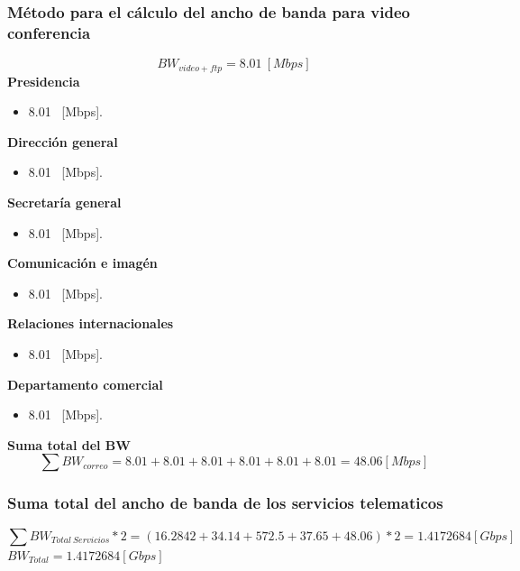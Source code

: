 \documentclass[12pt,letterpaper]{article}
\begin{document}
\subsubsection{Método para el cálculo del ancho de banda para video conferencia}
\begin{equation}
    BW_{video+ftp}=8.01 \ [Mbps]
\end{equation}
\textbf{Presidencia}
\begin{itemize}
    \item 8.01 \ [Mbps].
\end{itemize}
\textbf{Dirección general}
\begin{itemize}
    \item 8.01 \ [Mbps].
\end{itemize}
\textbf{Secretaría general}
\begin{itemize}
    \item 8.01 \ [Mbps].
\end{itemize}
\textbf{Comunicación e imagén}
\begin{itemize}
    \item 8.01 \ [Mbps].
\end{itemize}
\textbf{Relaciones internacionales}
\begin{itemize}
    \item 8.01 \ [Mbps].
\end{itemize}
\textbf{Departamento comercial}
\begin{itemize}
    \item 8.01 \ [Mbps].
\end{itemize}
\textbf{Suma total del BW}
\begin{equation}
    \sum BW_{correo}=8.01+8.01+8.01+8.01+8.01+8.01=48.06[Mbps]
\end{equation}

\subsubsection{Suma total del ancho de banda de los servicios telematicos}
\begin{equation}
    \sum BW_{Total \ Servicios}*2=(16.2842+34.14+572.5+37.65+48.06)*2=1.4172684[Gbps]
\end{equation}
\newline
$BW_{Total}=1.4172684[Gbps]$
\end{document}
